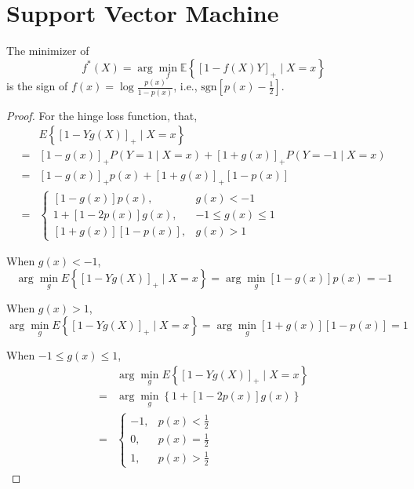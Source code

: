 \chapter{Support Vector Machine}

\begin{theorem}
	The minimizer of
	\begin{equation*}
		f^{*}(X)=\arg\min_{f}\mathbb{E}\left\{\left[1-f(X)Y\right]_{+}\mid X=x\right\}
	\end{equation*}
	is the sign of $f(x)=\log\frac{p(x)}{1-p(x)}$, i.e., $\text{sgn}\left[p(x)-\frac{1}{2}\right]$.
\end{theorem}

\begin{proof}
	For the hinge loss function, that,
	\begin{equation*}
		\begin{aligned}
			  & E\left\{\left[1-Yg(X)\right]_{+}\mid X=x\right\}                                                   \\
			= & \left[1-g(x)\right]_{+}P\left(Y=1\mid X=x\right)+\left[1+g(x)\right]_{+}P\left(Y=-1\mid X=x\right) \\
			= & \left[1-g(x)\right]_{+}p(x)+\left[1+g(x)\right]_{+}\left[1-p(x)\right]                             \\
			= & \left\{\begin{array}{ll}
				           \left[1-g(x)\right]p(x),                & g(x)<-1           \\
				           1+\left[1-2p(x)\right]g(x),             & -1\leq g(x)\leq 1 \\
				           \left[1+g(x)\right]\left[1-p(x)\right], & g(x)>1
			           \end{array}\right.
		\end{aligned}
	\end{equation*}

	When $g(x)<-1$,
	\begin{equation*}
		\arg\min_{g}E\left\{\left[1-Yg(X)\right]_{+}\mid X=x\right\}=\arg\min_{g}\left[1-g(x)\right]p(x)=-1
	\end{equation*}

	When $g(x)>1$,
	\begin{equation*}
		\arg\min_{g}E\left\{\left[1-Yg(X)\right]_{+}\mid X=x\right\}=\arg\min_{g}\left[1+g(x)\right]\left[1-p(x)\right]=1
	\end{equation*}

	When $-1\leq g(x)\leq 1$,
	\begin{equation*}
		\begin{aligned}
			  & \arg\min_{g}E\left\{\left[1-Yg(X)\right]_{+}\mid X=x\right\} \\
			= & \arg\min_{g}\left\{1+\left[1-2p(x)\right]g(x)\right\}        \\
			= & \left\{\begin{array}{ll}
				           -1, & p(x)<\frac{1}{2} \\
				           0,  & p(x)=\frac{1}{2} \\
				           1,  & p(x)>\frac{1}{2}
			           \end{array}\right.
		\end{aligned}
	\end{equation*}


\end{proof}
